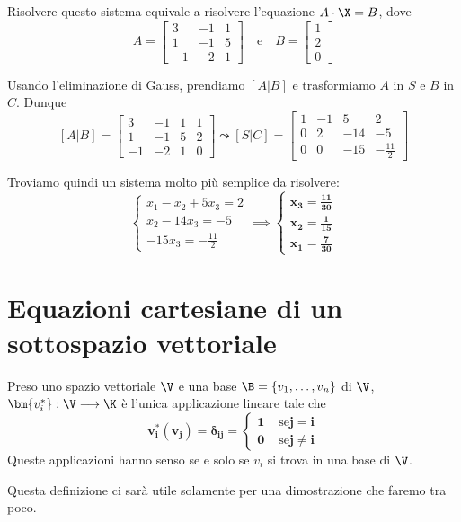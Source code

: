 \documentclass[11pt, a4paper, titlepage, oneside]{scrbook}
\begin{document}
Risolvere questo sistema equivale a risolvere l'equazione $A \cdot \X = B$, dove 
\[A = \begin{bmatrix}
    3 & -1 & 1 \\
    1 & -1 & 5 \\
    -1 & -2 & 1
\end{bmatrix}
\quad \text{e} \quad
B = \begin{bmatrix}
    1 \\ 2 \\ 0
\end{bmatrix}
\]

Usando l'eliminazione di Gauss, prendiamo $[A | B]$ e trasformiamo $A$ in $S$ e $B$ in $C$. Dunque
\[
[A|B] = \left[\begin{array}{ccc|c}
    3 & -1 & 1 & 1 \\
    1 & -1 & 5 & 2 \\
    -1 & -2 & 1 & 0
\end{array}\right] \leadsto [S|C] = \left[ \begin{array}{ccc|c}
    1 & -1 & 5 & 2 \\
    0 & 2 & -14 & -5 \\
    0 & 0 & -15 & -\frac{11}{2}
\end{array}\right]
\]

Troviamo quindi un sistema molto più semplice da risolvere:
\[
\begin{cases}
x_1 - x_2 + 5x_3 = 2 \\
x_2 - 14 x_3 = -5  \\
-15 x_3 = -\frac{11}{2}
\end{cases}
\implies
\begin{cases}
    \bm{x_3 = \frac{11}{30}} \\
    \bm{x_2 = \frac{1}{15}} \\
    \bm{x_1 = \frac{7}{30}}
\end{cases}
\]

\section{Equazioni cartesiane di un sottospazio vettoriale}
\begin{Definizione}[]
\label{def-utile-solo-per-la-dimostrazione}
Preso uno spazio vettoriale $\V$ e una base $\B = \{v_1, \ldots, v_n\}$ di $\V$, \mbox{$\bm{v_i^*}: \V \longrightarrow \K$} è l'unica applicazione lineare tale che
\[
\bm{v_i^*(v_j) = \delta_{ij}} = \begin{cases}
    \bm{1} & \text{ se} \bm{j = i} \\
    \bm{0} & \text { se} \bm{j \neq i}
\end{cases}
\]
\NB Queste applicazioni hanno senso se e solo se $v_i$ si trova in una base di $\V$.
\end{Definizione}
Questa definizione ci sarà utile solamente per una dimostrazione che faremo tra poco.
\end{document}
